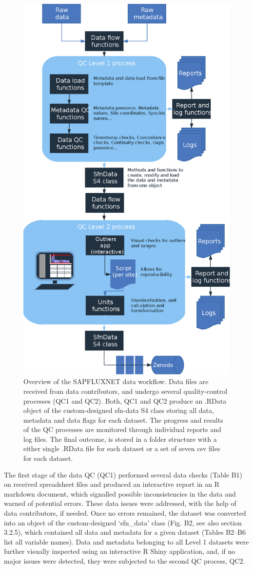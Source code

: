 \documentclass[11pt,twoside]{reedthesis}
\begin{document}
\setlength{\abovecaptionskip}{0pt}
\begin{figure}[H]

{\centering \includegraphics[width=0.6\linewidth]{figure/CH3/Figure1} 

}

\caption[Overview of the SAPFLUXNET data workflow.]{Overview of the SAPFLUXNET data workflow. Data files are received from data contributors, and undergo several quality-control processes (QC1 and QC2). Both, QC1 and QC2 produce an .RData object of the custom-designed sfn-data S4 class storing all data, metadata and data flags for each dataset. The progress and results of the QC processes are monitored through individual reports and log files. The final outcome, is stored in a folder structure with a either single .RData file for each dataset or a set of seven csv files for each dataset.}\label{fig:Ch2plot1}
\end{figure}
The first stage of the data QC (QC1) performed several data checks
(Table B1) on received spreadsheet files and produced an interactive
report in an R markdown document, which signalled possible
inconsistencies in the data and warned of potential errors. These data
issues were addressed, with the help of data contributors, if needed.
Once no errors remained, the dataset was converted into an object of the
custom-designed `sfn\_data' class (Fig. B2, see also section 3.2.5),
which contained all data and metadata for a given dataset (Tables B2--B6
list all variable names). Data and metadata belonging to all Level 1
datasets were further visually inspected using an interactive R Shiny
application, and, if no major issues were detected, they were subjected
to the second QC process, QC2.\par
\end{document}
